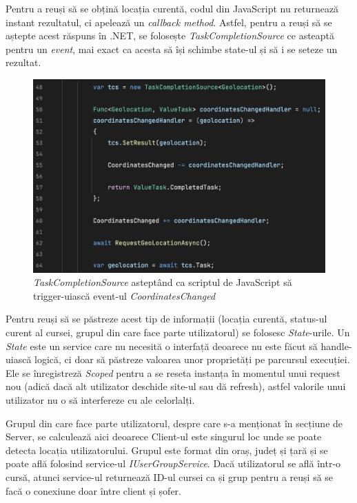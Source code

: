 Pentru a reuși să se obțină locația curentă, codul din JavaScript nu returnează instant rezultatul, ci
apelează un \textit{callback method}. Astfel, pentru a reuși să se aștepte acest răspuns în .NET, se folosește
\textit{TaskCompletionSource} ce asteaptă pentru un \textit{event}, mai exact ca acesta să își schimbe state-ul și 
să i se seteze un rezultat.

\begin{figure}[H]
    \centering
    \includegraphics[width=14cm]{Assets/tcs.png}
    \caption{\textit{TaskCompletionSource} asteptând ca scriptul de JavaScript să trigger-uiască event-ul \textit{CoordinatesChanged}}
    \label{fig:tcs}
\end{figure}

Pentru reuși să se păstreze acest tip de informații (locația curentă, status-ul curent al cursei,
grupul din care face parte utilizatorul) se folosesc \textit{State}-urile. Un \textit{State} este un service
care nu necesită o interfață deoarece nu este făcut să handle-uiască logică, ci doar să
păstreze valoarea unor proprietăți pe parcursul execuției. Ele se înregistreză \textit{Scoped}
pentru a se reseta instanța în momentul unui request nou (adică dacă alt utilizator deschide site-ul sau dă refresh), astfel
valorile unui utilizator nu o să interfereze cu ale celorlalți.

Grupul din care face parte utilizatorul, despre care s-a menționat în secțiune de Server, se calculează 
aici deoarece Client-ul este singurul loc unde se poate detecta locația utilizatorului.
Grupul este format din oraș, județ și țară și se poate află folosind service-ul \textit{IUserGroupService}.
Dacă utilizatorul se află într-o cursă, atunci service-ul returnează ID-ul cursei ca și grup pentru a reuși să
se facă o conexiune doar între client și șofer.

